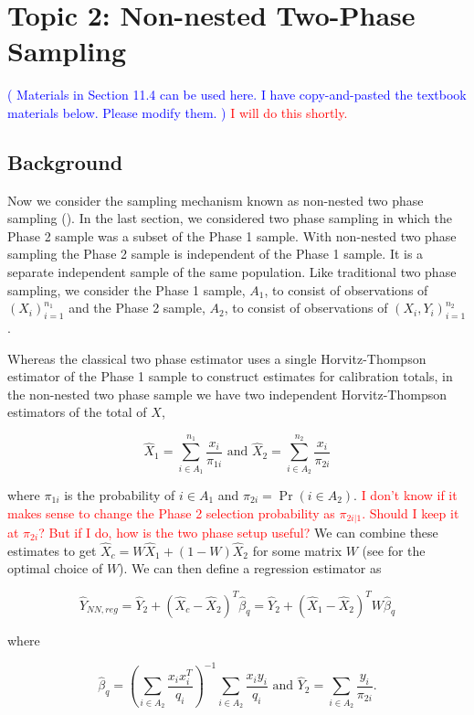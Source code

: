 \documentclass[12pt]{article}
\begin{document}
\section{Topic 2: Non-nested Two-Phase Sampling}

\textcolor{blue}{
( Materials in Section 11.4 can be used here. I have copy-and-pasted the
textbook materials below. Please modify them.  )
}
\textcolor{red}{I will do this shortly.}

\subsection{Background}

Now we consider the sampling mechanism known as non-nested two phase sampling 
(\cite{kim2024statistics}). In the last section, we considered two phase sampling
in which the Phase 2 sample was a subset of the Phase 1 sample. With non-nested
two phase sampling the Phase 2 sample is independent of the Phase 1 sample. It
is a separate independent sample of the same population. Like traditional two
phase sampling, we consider the Phase 1 sample, $A_1$, to consist of
observations of $(X_i)_{i = 1}^{n_1}$ and the Phase 2 sample, $A_2$, to consist
of observations of $(X_i, Y_i)_{i = 1}^{n_2}$. 

Whereas the classical two phase estimator uses a single Horvitz-Thompson
estimator of the Phase 1 sample to construct estimates for calibration totals,
in the non-nested two phase sample we have two independent Horvitz-Thompson
estimators of the total of $X$,

$$\hat X_1 = \sum_{i \in A_1}^{n_1} \frac{x_i}{\pi_{1i}} \text{ and } 
\hat X_2 = \sum_{i \in A_2}^{n_2} \frac{x_i}{\pi_{2i}}$$

where $\pi_{1i}$ is the probability of $i \in A_1$ and $\pi_{2i} = \Pr(i \in
A_2)$. \textcolor{red}{I don't know if it makes sense to change the Phase 2
selection probability as $\pi_{2i|1}$. Should I keep it at $\pi_{2i}$? But if
I do, how is the two phase setup useful?} We can combine these estimates to get
$\hat X_c = W \hat X_1 + (1 - W)\hat X_2$ for some matrix $W$ (see
\cite{merkouris2004combining} for the optimal choice of $W$). We can then define
a regression estimator as

$$
\hat Y_{NN, reg} = \hat Y_2 + (\hat X_c - \hat X_2)^T \hat \beta_q = 
\hat Y_2 + (\hat X_1 - \hat X_2)^T W\hat \beta_q 
$$

where 

$$\hat \beta_q = \left(\sum_{i \in A_2} \frac{x_i x_i^T}{q_i}\right)^{-1}
\sum_{i \in A_2} \frac{x_i y_i}{q_i} \text{ and }\hat Y_2 = \sum_{i \in A_2}
\frac{y_i}{\pi_{2i}}.$$
\end{document}
